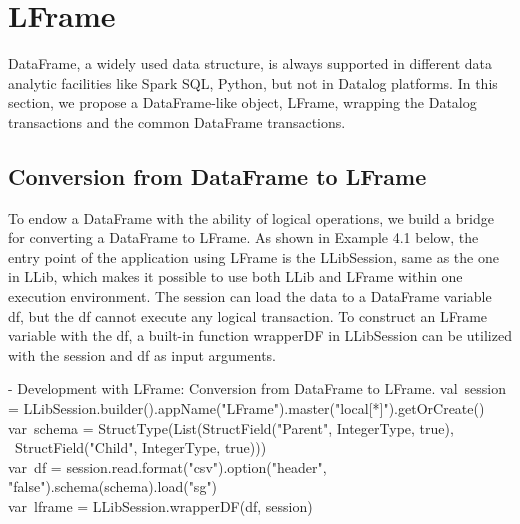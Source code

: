 \section{LFrame}
\label{lframe}
DataFrame, a widely used data structure, is always supported in different data analytic facilities like Spark SQL, Python, but not in Datalog platforms. In this section, we propose a DataFrame-like object, LFrame, wrapping the Datalog transactions and the common DataFrame transactions.



\subsection{Conversion from DataFrame to LFrame}
\label{sec:utility}
To endow a DataFrame with the ability of logical operations, we build a bridge for converting a DataFrame to LFrame. 
As shown in Example 4.1 below, the entry point of the application using LFrame is the LLibSession, same as the one in LLib, which makes it possible to use both LLib and LFrame within one execution environment. 
The session can  load the data to a DataFrame variable df, but the df cannot execute any logical transaction. To construct an LFrame variable with the  df, a built-in function wrapperDF in LLibSession can be utilized with the session and df as input arguments. 

\vspace{0.5em}
 - Development with LFrame:  Conversion from DataFrame to LFrame.
\bldl
val\ session = LLibSession.builder().appName("LFrame").master("local[*]").getOrCreate() \\
var\ schema = StructType(List(StructField("Parent", IntegerType, true),\\ \ StructField("Child", IntegerType, true)))\\
var\ df = session.read.format("csv").option("header", "false").schema(schema).load("sg")\\
var\ lframe = LLibSession.wrapperDF(df, session)
\eldl

